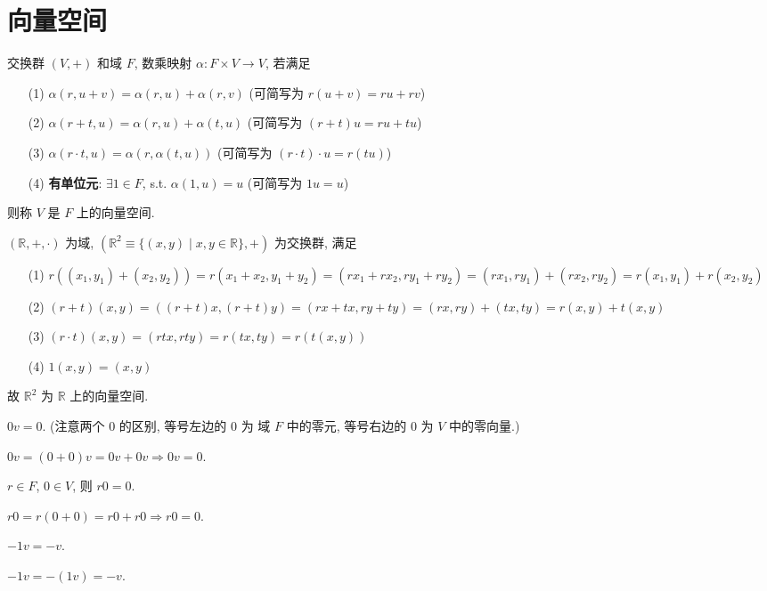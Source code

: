 \documentclass{note}
\begin{document}
\fi
\chapter{向量空间}
\begin{df}[向量空间]
    交换群 $(V,+)$ 和域 $F$, 数乘映射 $\alpha:F\times V\rightarrow V$, 若满足
    \begin{itemize}
        \item[(1)] $\alpha(r,u+v)=\alpha(r,u)+\alpha(r,v)$ (可简写为 $r(u+v)=ru+rv$)
        \item[(2)] $\alpha(r+t,u)=\alpha(r,u)+\alpha(t,u)$ (可简写为 $(r+t)u=ru+tu$)
        \item[(3)] $\alpha(r\cdot t,u)=\alpha(r,\alpha(t,u))$ (可简写为 $(r\cdot t)\cdot u=r(tu)$)
        \item[(4)] \textbf{有单位元}: $\exists 1\in F$, s.t. $\alpha(1,u)=u$ (可简写为 $1u=u$)
    \end{itemize}
    则称 $V$ 是 $F$ 上的向量空间.
\end{df}

\begin{eg}[直角坐标系]
    $(\mathbb{R},+,\cdot)$ 为域, $(\mathbb{R}^2\equiv\{(x,y)\mid x,y\in\mathbb{R}\},+)$ 为交换群, 满足
    \begin{itemize}
        \item[(1)] $r((x_1,y_1)+(x_2,y_2))=r(x_1+x_2,y_1+y_2)=(rx_1+rx_2,ry_1+ry_2)=(rx_1,ry_1)+(rx_2,ry_2)=r(x_1,y_1)+r(x_2,y_2)$
        \item[(2)] $(r+t)(x,y)=((r+t)x,(r+t)y)=(rx+tx,ry+ty)=(rx,ry)+(tx,ty)=r(x,y)+t(x,y)$
        \item[(3)] $(r\cdot t)(x,y)=(rtx,rty)=r(tx,ty)=r(t(x,y))$
        \item[(4)] $1(x,y)=(x,y)$
    \end{itemize}
    故 $\mathbb{R}^2$ 为 $\mathbb{R}$ 上的向量空间.
\end{eg}

$0v=0$. (注意两个 $0$ 的区别, 等号左边的 $0$ 为 域 $F$ 中的零元, 等号右边的 $0$ 为 $V$ 中的零向量.)
\begin{pf}
    $0v=(0+0)v=0v+0v\Longrightarrow 0v=0$.
\end{pf}

$r\in F$, $0\in V$, 则 $r0=0$.
\begin{pf}
    $r0=r(0+0)=r0+r0\Longrightarrow r0=0$.
\end{pf}

$-1v=-v$.
\begin{pf}
    $-1v=-(1v)=-v$.
\end{pf}
\end{document}
